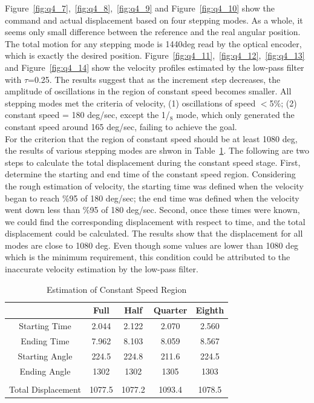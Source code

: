 \documentclass{article}
\theoremstyle{plain}
\theoremstyle{definition}
\theoremstyle{remark}
\begin{document}
Figure~\ref{fig:q4_7},~\ref{fig:q4_8},~\ref{fig:q4_9} and Figure~\ref{fig:q4_10} show the command and actual displacement based on four stepping modes. As a whole, it seems only small difference between the reference and the real angular position. The total motion for any stepping mode is 1440deg read by the optical encoder, which is exactly the desired position. Figure~\ref{fig:q4_11},~\ref{fig:q4_12},~\ref{fig:q4_13} and Figure~\ref{fig:q4_14} show the velocity profiles estimated by the low-pass filter with $\tau$=0.25. The results suggest that as the increment step decreases, the amplitude of oscillations in the region of constant speed becomes smaller. All stepping modes met the criteria of velocity, (1) oscillations of speed $<$5\%; (2) constant speed = 180 deg/sec, except the 1/${_8}$ mode, which only generated the constant speed around 165 deg/sec, failing to achieve the goal. \\

For the criterion that the region of constant speed should be at least 1080 deg, the results of various stepping modes are shwon in Table~\ref{table:Q4_1}. The following are two steps to calculate the total displacement during the constant speed stage. First, determine the starting and end time of the constant speed region. Considering the rough estimation of velocity, the starting time was defined when the velocity began to reach \%95 of 180 deg/sec; the end time was defined when the velocity went down less than \%95 of 180 deg/sec. Second, once these times were known, we could find the corresponding displacement with respect to time, and the total displacement could be calculated. The results show that the displacement for all modes are close to 1080 deg. Even though some values are lower than 1080 deg which is the minimum requirement, this condition could be attributed to the inaccurate velocity estimation by the low-pass filter.   

\begin{table}[ht]
\caption{Estimation of Constant Speed Region} %
\centering  %
\begin{tabular}{c c c c c}\\ %
\hline                        %

 & Full & Half & Quarter & Eighth\\ [0.5ex] %
\hline                  %
Starting Time & 2.044 & 2.122 & 2.070 & 2.560 \\ %
Ending Time & 7.962 & 8.103 & 8.059 & 8.567 \\
Starting Angle & 224.5 & 224.8 & 211.6 & 224.5 \\
Ending Angle & 1302 & 1302 & 1305 & 1303 \\
\hline \\%
Total Displacement & 1077.5 & 1077.2 & 1093.4 & 1078.5\\[1ex]      %

\hline %
\end{tabular}
\label{table:Q4_1} %
\end{table}
\end{document}
